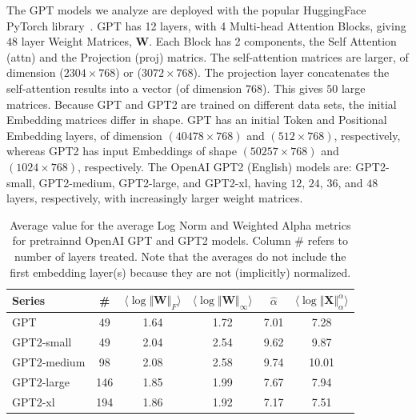 The GPT models we analyze are deployed with the popular HuggingFace PyTorch library~\cite{huggingface}.
GPT has 12 layers, with 4 Multi-head Attention Blocks, giving $48$ layer Weight Matrices, $\mathbf{W}$.
Each Block has 2 components, the Self Attention (attn) and the Projection (proj) matrics.  
The self-attention  matrices are larger, of dimension ($2304\times 768$) or ($3072\times 768$).
The projection layer concatenates the self-attention results into a vector (of dimension $768$).
This gives $50$ large matrices.
%
Because GPT and GPT2 are trained on different data sets, the initial Embedding matrices differ in shape.
GPT has an initial Token and Positional Embedding layers, of dimension $(40478\times 768)$ and $(512\times 768)$, respectively, whereas GPT2 has input Embeddings of shape $(50257\times 768)$ and $(1024\times 768)$, respectively. 
%
The OpenAI GPT2 (English) models are: GPT2-small, GPT2-medium, GPT2-large, and GPT2-xl, having $12$, $24$, $36$, and $48$ layers, respectively, with increasingly larger weight matrices.


\begin{table}[t]
\small
\begin{center}
\begin{tabular}{|p{1in}|c|c|c|c|c|}
\hline
 Series  & \#   & $\langle\log\Vert\mathbf{W}\Vert_{F}\rangle$ & $\langle\log\Vert\mathbf{W}\Vert_{\infty}\rangle$ & $\hat{\alpha}$ & $\langle\log\Vert\mathbf{X}\Vert^{\alpha}_{\alpha}\rangle$ \\
\hline
GPT & 49 & 1.64  & 1.72 & 7.01 & 7.28 \\
GPT2-small & 49 & 2.04  & 2.54& 9.62 & 9.87 \\
\hline
GPT2-medium & 98 & 2.08 & 2.58& 9.74 & 10.01 \\
GPT2-large & 146 & 1.85 & 1.99& 7.67 & 7.94 \\
GPT2-xl & 194 & 1.86 & 1.92 & 7.17 & 7.51 \\
\hline
\end{tabular}
\end{center}
\caption{Average value for the average Log Norm and Weighted Alpha metrics for pretrainnd OpenAI GPT and GPT2 models. Column \# refers to number of layers treated.  Note that the averages do not include the first embedding layer(s) because they are not (implicitly) normalized.  }
\label{table:nlp}
\end{table}


